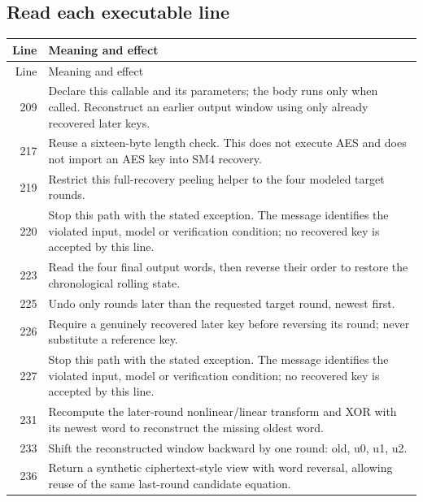 \subsection*{Read each executable line}
\begingroup\small\begin{longtable}{r >{\raggedright\arraybackslash}p{138mm}}\toprule Line&Meaning and effect\\\midrule\endfirsthead\toprule Line&Meaning and effect\\\midrule\endhead
209&Declare this callable and its parameters; the body runs only when called. Reconstruct an earlier output window using only already recovered later keys.\\
217&Reuse a sixteen-byte length check. This does not execute AES and does not import an AES key into SM4 recovery.\\
219&Restrict this full-recovery peeling helper to the four modeled target rounds.\\
220&Stop this path with the stated exception. The message identifies the violated input, model or verification condition; no recovered key is accepted by this line.\\
223&Read the four final output words, then reverse their order to restore the chronological rolling state.\\
225&Undo only rounds later than the requested target round, newest first.\\
226&Require a genuinely recovered later key before reversing its round; never substitute a reference key.\\
227&Stop this path with the stated exception. The message identifies the violated input, model or verification condition; no recovered key is accepted by this line.\\
231&Recompute the later-round nonlinear/linear transform and XOR with its newest word to reconstruct the missing oldest word.\\
233&Shift the reconstructed window backward by one round: old, u0, u1, u2.\\
236&Return a synthetic ciphertext-style view with word reversal, allowing reuse of the same last-round candidate equation.\\
\bottomrule\end{longtable}\endgroup
